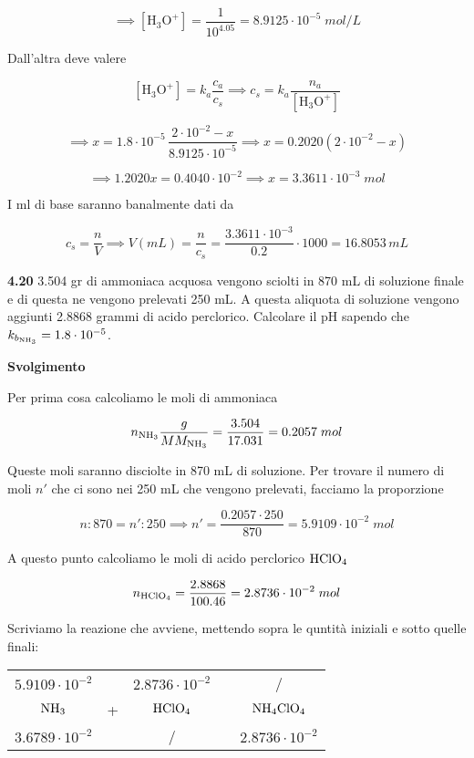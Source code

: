 $$\implies
[\text{H}_3\text{O}^+]=\frac{1}{10^{4.05}}=8.9125 \cdot 10^{-5}\;mol/L$$

Dall'altra deve valere

$$[\text{H}_3\text{O}^+]=k_a\frac{c_a}{c_s}
\implies
c_s=k_a\frac{n_a}{[\text{H}_3\text{O}^+]}$$

$$\implies
x=1.8 \cdot 10^{-5}\,\frac{2 \cdot 10^{-2} - x}{8.9125 \cdot 10^{-5}}
\implies
x=0.2020(2 \cdot 10^{-2} - x)$$

$$\implies
1.2020 x = 0.4040 \cdot 10^{-2}
\implies x=3.3611 \cdot 10^{-3}\;mol$$

I ml di base saranno banalmente dati da

$$c_s=\frac{n}{V}
\implies
V(mL)=\frac{n}{c_s}=\frac{3.3611 \cdot 10^{-3}}{0.2} \cdot 1000
=16.8053\,mL$$



\vspace{0.2cm}\textbf{4.20} 3.504 gr di ammoniaca acquosa vengono sciolti in 870 mL di soluzione finale e di questa ne vengono prelevati 250 mL. A questa aliquota di soluzione vengono aggiunti 2.8868 grammi di acido perclorico. Calcolare il pH sapendo che $k_{b_{\rm NH_3}}=1.8 \cdot 10^{-5}$.

\vspace{0.2cm}\large\textbf{Svolgimento}\normalsize

\vspace{0.2cm}Per prima cosa calcoliamo le moli di ammoniaca

$$n_{\rm NH_3}\frac{g}{MM_{\rm NH_3}}
=\frac{3.504}{17.031}=0.2057\;mol$$

Queste moli saranno disciolte in 870 mL di soluzione. Per trovare il numero di moli $n'$ che ci sono nei 250 mL che vengono prelevati, facciamo la proporzione

$$n:870=n':250
\implies
n'=\frac{0.2057 \cdot 250}{870}=5.9109 \cdot 10^{-2}\;mol$$

A questo punto calcoliamo le moli di acido perclorico $\rm HClO_4$

$$n_{\rm HClO_4}=\frac{2.8868}{100.46}=2.8736 \cdot 10^{-2}\;mol$$

Scriviamo la reazione che avviene, mettendo sopra le quntità iniziali e sotto quelle finali:

\begin{center}
    \begin{tabular}{ccccc}
        $5.9109 \cdot 10^{-2}$ &  & $2.8736 \cdot 10^{-2}$ & & /\\
        $\rm NH_3$ & + & $\rm HClO_4$ & \ce{->} & $\rm NH_4ClO_4$\\
        $3.6789 \cdot 10^{-2}$ &  & / & & $2.8736 \cdot 10^{-2}$\\
    \end{tabular}
\end{center}

